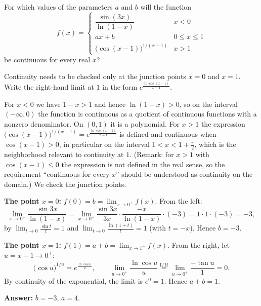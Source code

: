 
\begin{question}
For which values of the parameters $a$ and $b$ will the function
\[ f(x)=\begin{cases}\dfrac{\sin(3x)}{\ln(1-x)} & x<0\\[2mm] ax+b & 0\le x\le1\\[1mm] \big(\cos(x-1)\big)^{1/(x-1)} & x>1\end{cases} \]
be continuous for every real $x$?
\end{question}

\begin{hint}
Continuity needs to be checked only at the junction points $x=0$ and $x=1$. Write the right-hand limit at $1$ in the form $e^{\frac{\ln\cos(x-1)}{x-1}}$.
\end{hint}

\begin{solution}
For $x<0$ we have $1-x>1$ and hence $\ln(1-x)>0$, so on the interval $(-\infty,0)$ the function is continuous as a quotient of continuous functions with a nonzero denominator. On $(0,1)$ it is a polynomial. For $x>1$ the expression $\big(\cos(x-1)\big)^{1/(x-1)}=e^{\frac{\ln\cos(x-1)}{x-1}}$ is defined and continuous when $\cos(x-1)>0$, in particular on the interval $1<x<1+\frac\pi2$, which is the neighborhood relevant to continuity at $1$. (Remark: for $x>1$ with $\cos(x-1)\le0$ the expression is not defined in the real sense, so the requirement ``continuous for every $x$'' should be understood as continuity on the domain.) We check the junction points.

\textbf{The point $x=0$:} $f(0)=b=\lim_{x\to0^+}f(x)$. From the left:
\[ \lim_{x\to0^-}\frac{\sin3x}{\ln(1-x)}=\lim_{x\to0^-}\frac{\sin3x}{3x}\cdot\frac{-x}{\ln(1-x)}\cdot(-3)=1\cdot1\cdot(-3)=-3, \]
by $\lim_{t\to0}\frac{\sin t}{t}=1$ and $\lim_{t\to0}\frac{\ln(1+t)}{t}=1$ (with $t=-x$). Hence $b=-3$.

\textbf{The point $x=1$:} $f(1)=a+b=\lim_{x\to1^-}f(x)$. From the right, let $u=x-1\to0^+$:
\[ \big(\cos u\big)^{1/u}=e^{\frac{\ln\cos u}{u}},\qquad \lim_{u\to0^+}\frac{\ln\cos u}{u}\overset{\text{L'H}}{=}\lim_{u\to0^+}\frac{-\tan u}{1}=0. \]
By continuity of the exponential, the limit is $e^0=1$. Hence $a+b=1$.

\textbf{Answer:} $b=-3$, $a=4$.
\end{solution}
